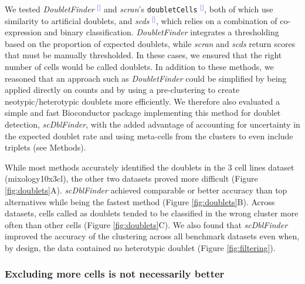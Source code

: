 \documentclass[11pt]{article}
\renewcommand{\cite}[1]{\textcolor{Blue}{$^[$\supercite{#1}$^]$}}
\begin{document}
We tested \textit{DoubletFinder} \cite{mcginnisDoubletfinder2019} and \textit{scran}'s \texttt{doubletCells} \cite{LunScran2016}, both of which use similarity to artificial doublets, and \textit{scds} \cite{BaisScds2019}, which relies on a combination of co-expression and binary classification. \textit{DoubletFinder} integrates a thresholding based on the proportion of expected doublets, while \textit{scran} and \textit{scds} return scores that must be manually thresholded. In these cases, we ensured that the right number of cells would be called doublets. In addition to these methods, we reasoned that an approach such as \textit{DoubletFinder} could be simplified by being applied directly on counts and by using a pre-clustering to create neotypic/heterotypic doublets more efficiently. We therefore also evaluated a simple and fast Bioconductor package implementing this method for doublet detection, \textit{scDblFinder}, with the added advantage of accounting for uncertainty in the expected doublet rate and using meta-cells from the clusters to even include triplets (see Methods).

While most methods accurately identified the doublets in the 3 cell lines dataset (mixology10x3cl), the other two datasets proved more difficult (Figure \ref{fig:doublets}A). \textit{scDblFinder} achieved comparable or better accuracy than top alternatives while being the fastest method (Figure \ref{fig:doublets}B). Across datasets, cells called as doublets tended to be classified in the wrong cluster more often than other cells (Figure \ref{fig:doublets}C). We also found that \textit{scDblFinder} improved the accuracy of the clustering across all benchmark datasets even when, by design, the data contained no heterotypic doublet (Figure \ref{fig:filtering}).

\subsubsection*{Excluding more cells is not necessarily better}
\end{document}
